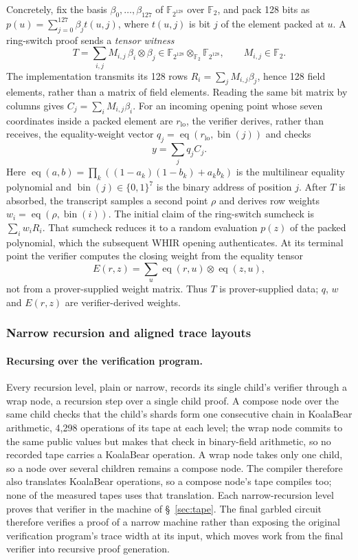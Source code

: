 \documentclass[11pt]{article}
\newcommand{\F}{\mathbb{F}_{2^{128}}}
\begin{document}
Concretely, fix the basis $\beta_0,\ldots,\beta_{127}$ of $\F$ over
$\mathbb F_2$, and pack 128 bits as
$p(u)=\sum_{j=0}^{127}\beta_j t(u,j)$, where $t(u,j)$ is bit $j$ of the element packed at $u$. A ring-switch proof sends a
\emph{tensor witness}
\[
  T=\sum_{i,j}M_{i,j}\,\beta_i\otimes\beta_j
    \in\F\otimes_{\mathbb F_2}\F,
  \qquad M_{i,j}\in\mathbb F_2.
\]
The implementation transmits its 128 rows
$R_i=\sum_jM_{i,j}\beta_j$, hence 128 field elements, rather than a
matrix of field elements. Reading the same bit matrix by columns gives
$C_j=\sum_iM_{i,j}\beta_i$. For an incoming opening point whose seven
coordinates inside a packed element are $r_{\mathrm{lo}}$, the verifier
derives, rather than receives, the equality-weight vector
$q_j=\operatorname{eq}(r_{\mathrm{lo}},\operatorname{bin}(j))$ and checks
\[
  y=\sum_j q_jC_j.
\]
Here
$\operatorname{eq}(a,b)=\prod_k((1-a_k)(1-b_k)+a_kb_k)$ is the
multilinear equality polynomial and $\operatorname{bin}(j)\in\{0,1\}^7$
is the binary address of position $j$.
After $T$ is absorbed, the transcript samples a second point $\rho$ and
derives row weights
$w_i=\operatorname{eq}(\rho,\operatorname{bin}(i))$. The initial claim of
the ring-switch sumcheck is $\sum_iw_iR_i$. That sumcheck reduces it to a
random evaluation $p(z)$ of the packed polynomial, which the subsequent
WHIR opening authenticates. At its terminal point the verifier computes the
closing weight from the equality tensor
\[
  E(r,z)=\sum_u\operatorname{eq}(r,u)\otimes
                    \operatorname{eq}(z,u),
\]
not from a prover-supplied weight matrix. Thus $T$ is prover-supplied data;
$q$, $w$ and $E(r,z)$ are verifier-derived weights.

\subsubsection{Narrow recursion and aligned trace layouts}

\paragraph{Recursing over the verification program.} Every recursion level,
plain or narrow, records its single child's verifier through a wrap node, a
recursion step over a single child proof. A compose node over the same child
checks that the child's shards form one consecutive chain in KoalaBear
arithmetic, 4{,}298 operations of its tape at each level; the wrap node commits
to the same public values but makes that check in binary-field arithmetic, so
no recorded tape carries a KoalaBear operation. A wrap node takes only one
child, so a node over several children remains a compose node. The compiler
therefore also translates KoalaBear operations, so a compose node's tape
compiles too; none of the measured tapes uses that translation.
Each narrow-recursion level proves that verifier in the machine of
\S~\ref{sec:tape}. The final garbled circuit therefore verifies a proof of a narrow
machine rather than exposing the original verification program's trace width
at its input, which moves work from the final verifier into recursive proof
generation.
\end{document}
